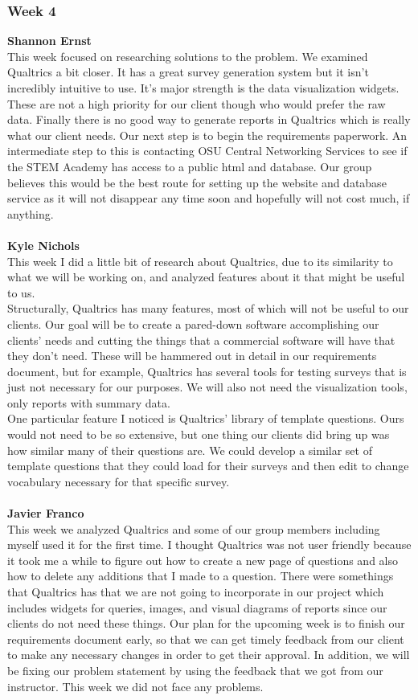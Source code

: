 \documentclass[../final.tex]{subfiles}
\begin{document}
\subsubsection{Week 4}
\textbf{Shannon Ernst} \\
This week focused on researching solutions to the problem. We examined Qualtrics a bit closer. It has a great survey generation system but it isn't incredibly intuitive to use. It's major strength is the data visualization widgets. These are not a high priority for our client though who would prefer the raw data. Finally there is no good way to generate reports in Qualtrics which is really what our client needs. Our next step is to begin the requirements paperwork. An intermediate step to this is contacting OSU Central Networking Services to see if the STEM Academy has access to a public html and database. Our group believes this would be the best route for setting up the website and database service as it will not disappear any time soon and hopefully will not cost much, if anything. \\ \\
\textbf{Kyle Nichols}\\ 
This week I did a little bit of research about Qualtrics, due to its similarity to what we will be working on, and analyzed features about it that might be useful to us.\\
Structurally, Qualtrics has many features, most of which will not be useful to our clients. Our goal will be to create a pared-down software accomplishing our clients' needs and cutting the things that a commercial software will have that they don't need. These will be hammered out in detail in our requirements document, but for example, Qualtrics has several tools for testing surveys that is just not necessary for our purposes. We will also not need the visualization tools, only reports with summary data.\\
One particular feature I noticed is Qualtrics' library of template questions. Ours would not need to be so extensive, but one thing our clients did bring up was how similar many of their questions are. We could develop a similar set of template questions that they could load for their surveys and then edit to change vocabulary necessary for that specific survey.\\ \\
\textbf{Javier Franco}\\ 
This week we analyzed Qualtrics and some of our group members including myself used it for the first time. I thought Qualtrics was not user friendly because it took me a while to figure out how to create a new page of questions and also how to delete any additions that I made to a question. There were somethings that Qualtrics has that we are not going to incorporate in our project which includes widgets for queries, images, and visual diagrams of reports since our clients do not need these things. Our plan for the upcoming week is to finish our requirements document early, so that we can get timely feedback from our client to make any necessary changes in order to get their approval. In addition, we will be fixing our problem statement by using the feedback that we got from our instructor. This week we did not face any problems.\\
\end{document}
